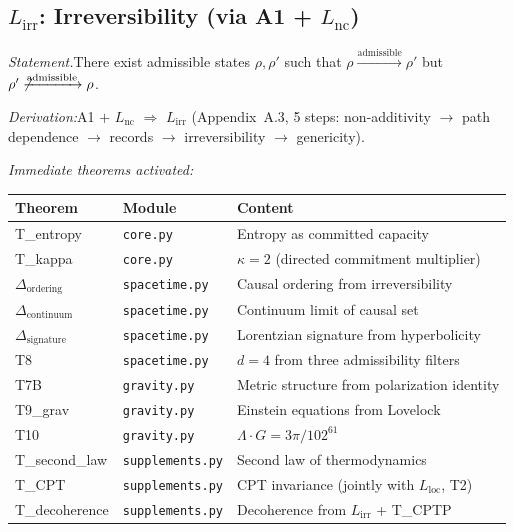 \documentclass[11pt]{article}
\newcommand{\LG}{\Lambda \cdot G}
\newcommand{\Lnc}{L_{\mathrm{nc}}}
\newcommand{\Lloc}{L_{\mathrm{loc}}}
\newcommand{\Lirr}{L_{\mathrm{irr}}}
\begin{document}
\subsection{\texorpdfstring{$L_{\mathrm{irr}}$}{Lirr}: Irreversibility (via A1 + \texorpdfstring{$L_{\mathrm{nc}}$}{Lnc})}

\begin{tcolorbox}[apfbox, title={$\Lirr$ $\longrightarrow$ Spacetime and Thermodynamics}]
\textit{Statement.}\quad There exist admissible states $\rho, \rho'$ such that $\rho \xrightarrow{\mathrm{admissible}} \rho'$ but $\rho' \not\xrightarrow{\mathrm{admissible}} \rho$.

\textit{Derivation:}\quad A1 $+$ $\Lnc$ $\Rightarrow$ $\Lirr$ (Appendix~A.3, 5 steps: non-additivity $\to$ path dependence $\to$ records $\to$ irreversibility $\to$ genericity).

\smallskip\noindent\textit{Immediate theorems activated:}
\begin{center}
\small
\renewcommand{\arraystretch}{1.15}
\begin{tabular}{lll}
\toprule
\textbf{Theorem} & \textbf{Module} & \textbf{Content} \\
\midrule
T\_entropy & \texttt{core.py} & Entropy as committed capacity \\
T\_kappa & \texttt{core.py} & $\kappa = 2$ (directed commitment multiplier) \\
$\Delta_{\mathrm{ordering}}$ & \texttt{spacetime.py} & Causal ordering from irreversibility \\
$\Delta_{\mathrm{continuum}}$ & \texttt{spacetime.py} & Continuum limit of causal set \\
$\Delta_{\mathrm{signature}}$ & \texttt{spacetime.py} & Lorentzian signature from hyperbolicity \\
T8 & \texttt{spacetime.py} & $d = 4$ from three admissibility filters \\
T7B & \texttt{gravity.py} & Metric structure from polarization identity \\
T9\_grav & \texttt{gravity.py} & Einstein equations from Lovelock \\
T10 & \texttt{gravity.py} & $\LG = 3\pi/102^{61}$ \\
T\_second\_law & \texttt{supplements.py} & Second law of thermodynamics \\
T\_CPT & \texttt{supplements.py} & CPT invariance (jointly with $\Lloc$, T2) \\
T\_decoherence & \texttt{supplements.py} & Decoherence from $\Lirr$ + T\_CPTP \\
\bottomrule
\end{tabular}
\end{center}


\end{tcolorbox}
\end{document}
